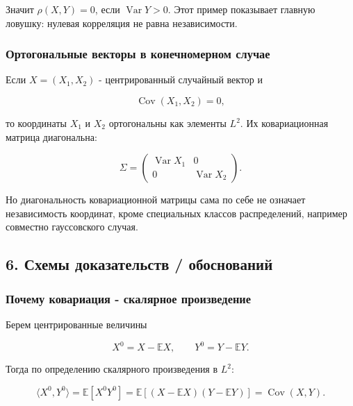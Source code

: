 \documentclass[
  11pt,
  a4paper,
]{article}
\begin{document}
Значит \(\rho(X,Y)=0\), если \(\operatorname{Var}Y>0\). Этот пример
показывает главную ловушку: нулевая корреляция не равна независимости.

\subsubsection{Ортогональные векторы в конечномерном
случае}\label{ux43eux440ux442ux43eux433ux43eux43dux430ux43bux44cux43dux44bux435-ux432ux435ux43aux442ux43eux440ux44b-ux432-ux43aux43eux43dux435ux447ux43dux43eux43cux435ux440ux43dux43eux43c-ux441ux43bux443ux447ux430ux435}

Если \(X=(X_1,X_2)\) - центрированный случайный вектор и

\[
\operatorname{Cov}(X_1,X_2)=0,
\]

то координаты \(X_1\) и \(X_2\) ортогональны как элементы \(L^2\). Их
ковариационная матрица диагональна:

\[
\Sigma
=
\begin{pmatrix}
\operatorname{Var}X_1 & 0\\
0 & \operatorname{Var}X_2
\end{pmatrix}.
\]

Но диагональность ковариационной матрицы сама по себе не означает
независимость координат, кроме специальных классов распределений,
например совместно гауссовского случая.

\subsection{6. Схемы доказательств /
обоснований}\label{ux441ux445ux435ux43cux44b-ux434ux43eux43aux430ux437ux430ux442ux435ux43bux44cux441ux442ux432-ux43eux431ux43eux441ux43dux43eux432ux430ux43dux438ux439}

\subsubsection{Почему ковариация - скалярное
произведение}\label{ux43fux43eux447ux435ux43cux443-ux43aux43eux432ux430ux440ux438ux430ux446ux438ux44f---ux441ux43aux430ux43bux44fux440ux43dux43eux435-ux43fux440ux43eux438ux437ux432ux435ux434ux435ux43dux438ux435}

Берем центрированные величины

\[
X^0=X-\mathbb EX,
\qquad
Y^0=Y-\mathbb EY.
\]

Тогда по определению скалярного произведения в \(L^2\):

\[
\langle X^0,Y^0\rangle
=
\mathbb E[X^0Y^0]
=
\mathbb E[(X-\mathbb EX)(Y-\mathbb EY)]
=
\operatorname{Cov}(X,Y).
\]
\end{document}
